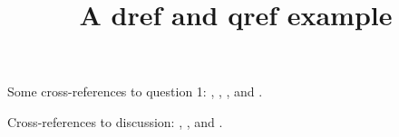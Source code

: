 \documentclass[onepage]{webquiz}
\title{A dref and qref example}
\begin{document}
  \begin{discussion}\label{d:one}
    Some cross-references to question 1: , ,
    , and .
  \end{discussion}
  \begin{question}\label{q:one}
    Cross-references to discussion:  , ,
     and .
  \end{question}
\end{document}
